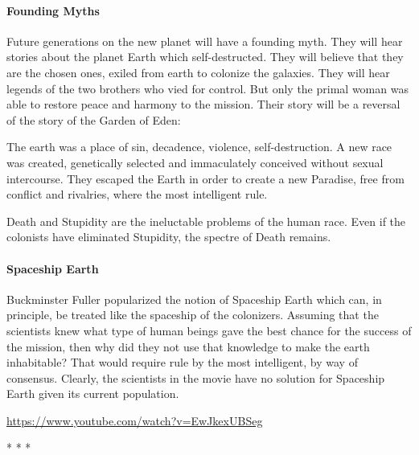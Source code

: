 \paragraph{Founding Myths}

Future generations on the new planet will have a founding myth. They will hear stories about the planet Earth which self-destructed. They will believe that they are the chosen ones, exiled from earth to colonize the galaxies. They will hear legends of the two brothers who vied for control. But only the primal woman was able to restore peace and harmony to the mission. Their story will be a reversal of the story of the Garden of Eden:

\begin{quotex}
The earth was a place of sin, decadence, violence, self-destruction. A new race was created, genetically selected and immaculately conceived without sexual intercourse. They escaped the Earth in order to create a new Paradise, free from conflict and rivalries, where the most intelligent rule.
\end{quotex}


Death and Stupidity are the ineluctable problems of the human race. Even if the colonists have eliminated Stupidity, the spectre of Death remains.

\paragraph{Spaceship Earth}

Buckminster Fuller popularized the notion of Spaceship Earth which can, in principle, be treated like the spaceship of the colonizers. Assuming that the scientists knew what type of human beings gave the best chance for the success of the mission, then why did they not use that knowledge to make the earth inhabitable? That would require rule by the most intelligent, by way of consensus. Clearly, the scientists in the movie have no solution for Spaceship Earth given its current population.

\url{https://www.youtube.com/watch?v=EwJkexUBSeg}


\begin{center}* * *\end{center}

